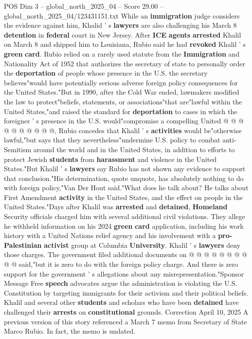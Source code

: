 \begin{textsample}{POS Dim 3 – global\_north\_2025\_04 – Score 29.00 – global\_north\_2025\_04/123431151.txt}
While an \textbf{immigration} judge considers the evidence against him, Khalid ' s \textbf{lawyers} are also challenging his March 8 \textbf{detention} in \textbf{federal} court in New Jersey.
After \textbf{ICE} \textbf{agents} \textbf{arrested} Khalil on March 8 and shipped him to Louisiana, Rubio said he had \textbf{revoked} Khalil ' s \textbf{green} \textbf{card}.
Rubio relied on a rarely used statute from the \textbf{Immigration} and Nationality Act of 1952 that authorizes the secretary of state to personally order the \textbf{deportation} of people whose presence in the U.S. the secretary believes"would have potentially serious adverse foreign policy consequences for the United States."But in 1990, after the Cold War ended, lawmakers modified the law to protect"beliefs, statements, or associations"that are"lawful within the United States,"and raised the standard for \textbf{deportation} to cases in which the foreigner ' s presence in the U.S. would"compromise a compelling United @ @ @ @ @ @ @ @ @ @, Rubio concedes that Khalil ' s \textbf{activities} would be"otherwise lawful,"but says that they nevertheless"undermine U.S. policy to combat anti-Semitism around the world and in the United States, in addition to efforts to protect Jewish \textbf{students} from \textbf{harassment} and violence in the United States."But Khalil ' s \textbf{lawyers} say Rubio has not shown any evidence to support that conclusion."His determination, quote unquote, has absolutely nothing to do with foreign policy,"Van Der Hout said."What does he talk about?
He talks about First Amendment \textbf{activity} in the United States, and the effect on people in the United States."Days after Khalil was \textbf{arrested} and \textbf{detained}, \textbf{Homeland} Security officials charged him with several additional civil violations.
They allege he withheld information on his 2024 \textbf{green} \textbf{card} application, including his work history with a United Nations relief agency and his involvement with a \textbf{pro-Palestinian} \textbf{activist} group at Columbia \textbf{University}.
Khalil ' s \textbf{lawyers} deny those charges.
The government filed additional documents on @ @ @ @ @ @ @ @ @ @ said,"but it is zero to do with the foreign policy charge.
And there is zero support for the government ' s allegations about any misrepresentation."Sponsor Message Free \textbf{speech} advocates argue the administration is violating the U.S.
Constitution by targeting immigrants for their activism and their political beliefs.
Khalil and several other \textbf{students} and scholars who have been \textbf{detained} have challenged their \textbf{arrests} on \textbf{constitutional} grounds.
Correction April 10, 2025 A previous version of this story referenced a March 7 memo from Secretary of State Marco Rubio.
In fact, the memo is undated.

\end{textsample}
